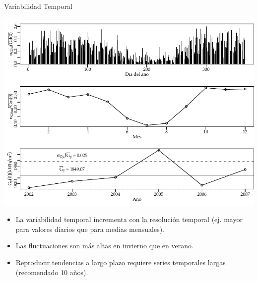 \documentclass[xcolor={usenames,svgnames,dvipsnames}]{beamer}
\begin{document}
\begin{frame}[label={sec:org1bb6a03}]{Variabilidad Temporal}
\begin{center}
\includegraphics[height=0.45\textheight]{../figs/VariabilidadRadiacionDiario.pdf}
\end{center}

\begin{itemize}
\item La variabilidad temporal \alert{incrementa con la resolución temporal} (ej. mayor para valores diarios que para medias mensuales).
\item Las fluctuaciones son \alert{más altas en invierno que en verano}.
\item Reproducir \alert{tendencias a largo plazo} requiere \alert{series temporales largas} (recomendado 10 años).
\end{itemize}
\end{frame}
\end{document}
